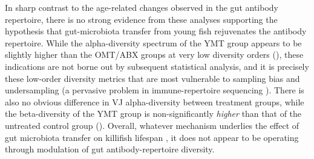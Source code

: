 In sharp contrast to the age-related changes observed in the gut antibody repertoire, there is no strong evidence from these analyses supporting the hypothesis that gut-microbiota transfer from young fish rejuvenates the antibody repertoire. While the alpha-diversity spectrum of the YMT group appears to be slightly higher than the OMT/ABX groups at very low diversity orders (), these indications are not borne out by subsequent statistical analysis, and it is precisely these low-order diversity metrics that are most vulnerable to sampling bias and undersampling (a pervasive problem in immune-repertoire sequencing \parencite{mora2016diversity}). There is also no obvious difference in VJ alpha-diversity between treatment groups, while the beta-diversity of the YMT group is non-significantly \textit{higher} than that of the untreated control group (). Overall, whatever mechanism underlies the effect of gut microbiota transfer on killifish lifespan \parencite{smith2017microbiota}, it does not appear to be operating through modulation of gut antibody-repertoire diversity.


